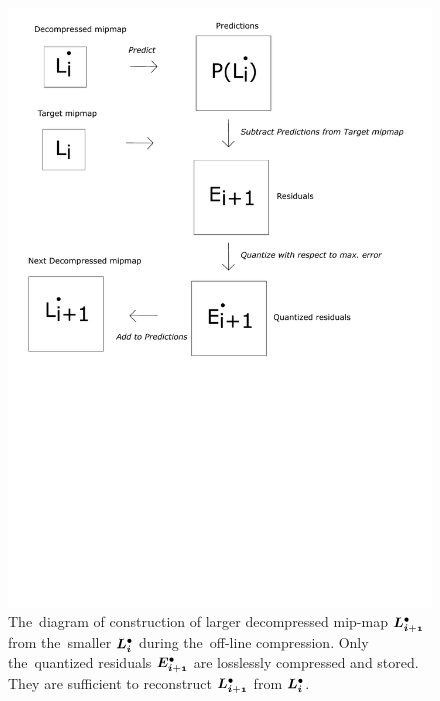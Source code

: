 	\begin{figure}
		\includegraphics[trim={0 12cm 1cm 0cm}, clip, width=1\textwidth]{figures/single_reconst.pdf}\centering
		\caption{The~diagram of construction of larger decompressed mip-map $\ldot{i+1}$ from the~smaller $\ldot{i}$ during the~off-line compression. Only the~quantized residuals $\objdot{E}{i+1}$ are losslessly compressed and stored. They are sufficient to reconstruct $\ldot{i+1}$ from $\ldot{i}$.}
		\label{fig:single_reconst}
	\end{figure}
	
